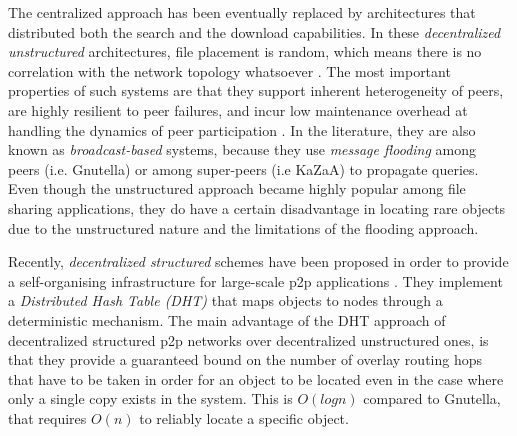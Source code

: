 \documentclass[acmcsur]{acmtrans2m}
\begin{document}
The centralized approach has been eventually replaced by architectures that distributed both the search and the download capabilities. In these \emph{decentralized unstructured} architectures, file placement is random, which means there is no correlation with the network topology whatsoever \cite{yang_improvep2psearch_2002}. The most important properties of such systems are that they support inherent heterogeneity of peers, are highly resilient to peer failures, and incur low maintenance overhead at handling the dynamics of peer participation \cite{stutzbach_churn_2006}. In the literature, they are also known as \emph{broadcast-based} systems, because they use \emph{message flooding} among peers (i.e. Gnutella\cite{gnutella}) or among super-peers (i.e KaZaA\cite{kazaa}) to propagate queries. 
Even though the unstructured approach became highly popular among file sharing applications, they do have a certain disadvantage in locating rare objects due to the unstructured nature and the limitations of the flooding approach. 

Recently, \emph{decentralized structured} schemes have been proposed in order to provide a self-organising infrastructure for large-scale p2p applications \cite{ratnasamy_can_2001,stoica_chord_2001,antony_pastry_2001,zhao_tapestry_2001,maymounkov_kademlia_2002}. They implement a \emph{Distributed Hash Table (DHT)} that maps objects to nodes through a deterministic mechanism. The main advantage of the DHT approach of decentralized structured p2p networks over decentralized unstructured ones, is that they provide a guaranteed bound on the number of overlay routing hops that have to be taken in order for an object to be located even in the case where only a single copy exists in the system. This is $O \left ( log n \right )$ compared to Gnutella, that requires $O \left ( n \right )$ to reliably locate a specific object.

\end{document}
